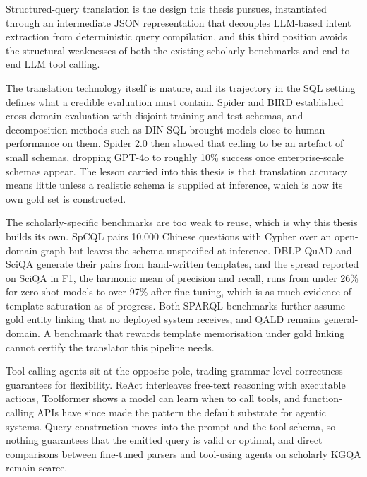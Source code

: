 Structured-query translation is the design this thesis pursues,
instantiated through an intermediate JSON representation that decouples
LLM-based intent extraction from deterministic query compilation, and
this third position avoids the structural weaknesses of both the
existing scholarly benchmarks and end-to-end LLM tool calling.

The translation technology itself is mature, and its trajectory in the
SQL setting defines what a credible evaluation must contain.  Spider
\cite{yu2018spider} and BIRD \cite{li2023bird} established cross-domain
evaluation with disjoint training and test schemas, and decomposition
methods such as DIN-SQL \cite{pourreza2023dinsql} brought models close
to human performance on them.  Spider 2.0 \cite{lei2024spider2} then
showed that ceiling to be an artefact of small schemas, dropping GPT-4o
to roughly 10\% success once enterprise-scale schemas appear.  The
lesson carried into this thesis is that translation accuracy means
little unless a realistic schema is supplied at inference, which is how
its own gold set is constructed.

The scholarly-specific benchmarks are too weak to reuse, which is why
this thesis builds its own.  SpCQL \cite{guo2022spcql} pairs 10,000
Chinese questions with Cypher over an open-domain graph but leaves the
schema unspecified at inference.  DBLP-QuAD \cite{banerjee2023dblpquad}
and SciQA \cite{auer2023sciqa} generate their pairs from hand-written
templates, and the spread reported on SciQA in F1, the harmonic mean of
precision and recall, runs from under 26\% for zero-shot models to over
97\% after fine-tuning, which is as much evidence of template
saturation as of progress.  Both SPARQL benchmarks further assume gold
entity linking that no deployed system receives, and QALD
\cite{usbeck2023qald10} remains general-domain.  A benchmark that
rewards template memorisation under gold linking cannot certify the
translator this pipeline needs.

Tool-calling agents sit at the opposite pole, trading grammar-level
correctness guarantees for flexibility.  ReAct \cite{yao2023react}
interleaves free-text reasoning with executable actions, Toolformer
\cite{schick2023toolformer} shows a model can learn when to call tools,
and function-calling APIs have since made the pattern the default
substrate for agentic systems.  Query construction moves into the
prompt and the tool schema, so nothing guarantees that the emitted
query is valid or optimal, and direct comparisons between fine-tuned
parsers and tool-using agents on scholarly KGQA remain scarce.


